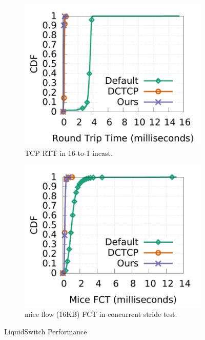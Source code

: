\begin{figure}[t]
        \centering
        \begin{subfigure}[b]{0.225\textwidth}
                \centering
                \includegraphics[width=\textwidth]{./figures/incast/16to1/incast_16to1_test_sockperf.pdf}
                \caption{TCP RTT in 16-to-1 incast.}
                \label{rtt}
        \end{subfigure}
        \begin{subfigure}[b]{0.225\textwidth}
                \centering
                \includegraphics[width=\textwidth]{./figures/macro_benchmarks/macro_4stride/stride4_mice16KB_fct.pdf}
                \caption{mice flow (16KB) FCT in concurrent stride test.}
                \label{fct}
        \end{subfigure}
        \caption{LiquidSwitch Performance}
        \label{performance}
\end{figure}
